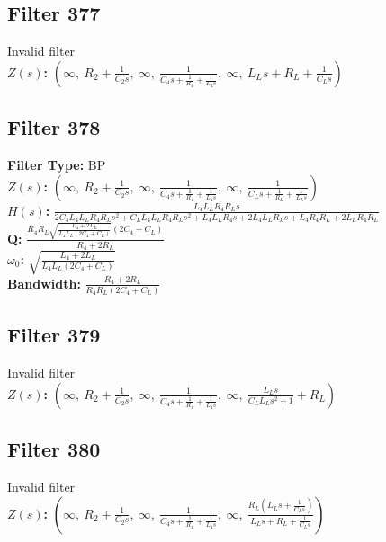 \documentclass{article}
\begin{document}
\subsection*{Filter 377}
Invalid filter \\ 
\textbf{$Z(s)$:} $\left( \infty, \  R_{2} + \frac{1}{C_{2} s}, \  \infty, \  \frac{1}{C_{4} s + \frac{1}{R_{4}} + \frac{1}{L_{4} s}}, \  \infty, \  L_{L} s + R_{L} + \frac{1}{C_{L} s}\right)$ \\ 
\subsection*{Filter 378}
\textbf{Filter Type:} BP \\ 
\textbf{$Z(s)$:} $\left( \infty, \  R_{2} + \frac{1}{C_{2} s}, \  \infty, \  \frac{1}{C_{4} s + \frac{1}{R_{4}} + \frac{1}{L_{4} s}}, \  \infty, \  \frac{1}{C_{L} s + \frac{1}{R_{L}} + \frac{1}{L_{L} s}}\right)$ \\ 
\textbf{$H(s)$:} $\frac{L_{4} L_{L} R_{4} R_{L} s}{2 C_{4} L_{4} L_{L} R_{4} R_{L} s^{2} + C_{L} L_{4} L_{L} R_{4} R_{L} s^{2} + L_{4} L_{L} R_{4} s + 2 L_{4} L_{L} R_{L} s + L_{4} R_{4} R_{L} + 2 L_{L} R_{4} R_{L}}$ \\ 
\textbf{Q:} $\frac{R_{4} R_{L} \sqrt{\frac{L_{4} + 2 L_{L}}{L_{4} L_{L} \left(2 C_{4} + C_{L}\right)}} \left(2 C_{4} + C_{L}\right)}{R_{4} + 2 R_{L}}$ \\ 
\textbf{$\omega_0$:} $\sqrt{\frac{L_{4} + 2 L_{L}}{L_{4} L_{L} \left(2 C_{4} + C_{L}\right)}}$ \\ 
\textbf{Bandwidth:} $\frac{R_{4} + 2 R_{L}}{R_{4} R_{L} \left(2 C_{4} + C_{L}\right)}$ \\ 
\subsection*{Filter 379}
Invalid filter \\ 
\textbf{$Z(s)$:} $\left( \infty, \  R_{2} + \frac{1}{C_{2} s}, \  \infty, \  \frac{1}{C_{4} s + \frac{1}{R_{4}} + \frac{1}{L_{4} s}}, \  \infty, \  \frac{L_{L} s}{C_{L} L_{L} s^{2} + 1} + R_{L}\right)$ \\ 
\subsection*{Filter 380}
Invalid filter \\ 
\textbf{$Z(s)$:} $\left( \infty, \  R_{2} + \frac{1}{C_{2} s}, \  \infty, \  \frac{1}{C_{4} s + \frac{1}{R_{4}} + \frac{1}{L_{4} s}}, \  \infty, \  \frac{R_{L} \left(L_{L} s + \frac{1}{C_{L} s}\right)}{L_{L} s + R_{L} + \frac{1}{C_{L} s}}\right)$ \\ 
\end{document}
